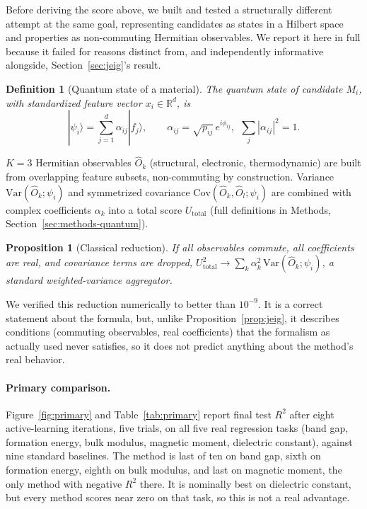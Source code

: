 \documentclass[10pt]{article}
\newtheorem{definition}{Definition}
\newtheorem{proposition}{Proposition}
\begin{document}
Before deriving the score above, we built and tested a structurally different attempt at the same goal, representing candidates as states in a Hilbert space and properties as non-commuting Hermitian observables. We report it here in full because it failed for reasons distinct from, and independently informative alongside, Section~\ref{sec:jeig}'s result.

\begin{definition}[Quantum state of a material]\label{def:state}
The quantum state of candidate $M_i$, with standardized feature vector $x_i\in\mathbb{R}^d$, is
\begin{equation}
|\psi_i\rangle = \sum_{j=1}^{d} \alpha_{ij} |f_j\rangle, \qquad \alpha_{ij}=\sqrt{p_{ij}}\,e^{i\phi_{ij}},\ \ \sum_j|\alpha_{ij}|^2=1. \label{eq:state}
\end{equation}
\end{definition}
$K=3$ Hermitian observables $\hat O_k$ (structural, electronic, thermodynamic) are built from overlapping feature subsets, non-commuting by construction. Variance $\mathrm{Var}(\hat O_k;\psi_i)$ and symmetrized covariance $\mathrm{Cov}(\hat O_k,\hat O_l;\psi_i)$ are combined with complex coefficients $\alpha_k$ into a total score $U_{\mathrm{total}}$ (full definitions in Methods, Section~\ref{sec:methods-quantum}).

\begin{proposition}[Classical reduction]\label{prop:classical}
If all observables commute, all coefficients are real, and covariance terms are dropped, $U_{\mathrm{total}}^2 \to \sum_k \alpha_k^2\,\mathrm{Var}(\hat O_k;\psi_i)$, a standard weighted-variance aggregator.
\end{proposition}
We verified this reduction numerically to better than $10^{-9}$. It is a correct statement about the formula, but, unlike Proposition~\ref{prop:jeig}, it describes conditions (commuting observables, real coefficients) that the formalism as actually used never satisfies, so it does not predict anything about the method's real behavior.

\paragraph{Primary comparison.} Figure~\ref{fig:primary} and Table~\ref{tab:primary} report final test $R^2$ after eight active-learning iterations, five trials, on all five real regression tasks (band gap, formation energy, bulk modulus, magnetic moment, dielectric constant), against nine standard baselines. The method is last of ten on band gap, sixth on formation energy, eighth on bulk modulus, and last on magnetic moment, the only method with negative $R^2$ there. It is nominally best on dielectric constant, but every method scores near zero on that task, so this is not a real advantage.
\end{document}
